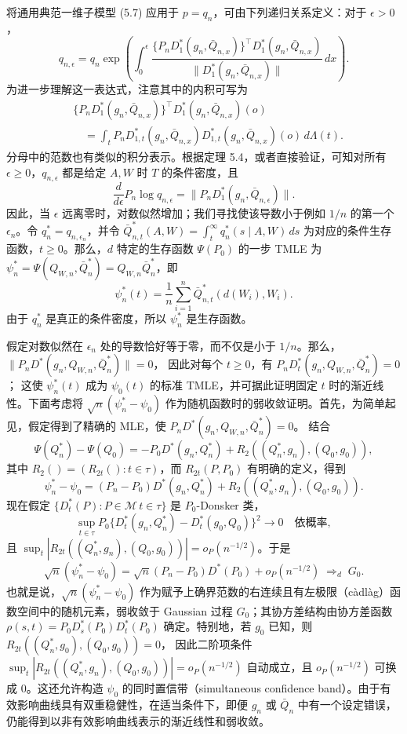 将通用典范一维子模型 (5.7) 应用于 $p=q_n$，可由下列递归关系定义：对于 $\epsilon>0$，
\[
 q_{n,\epsilon}=q_n\exp\left(\int_0^\epsilon
 \frac{\{P_nD_1^*(g_n,\bar Q_{n,x})\}^{\top}
 D_1^*(g_n,\bar Q_{n,x})}
 {\|D_1^*(g_n,\bar Q_{n,x})\|}\,dx\right).
\]
为进一步理解这一表达式，注意其中的内积可写为
\begin{equation}
 \begin{aligned}
 &\{P_nD_1^*(g_n,\bar Q_{n,x})\}^{\top}
 D_1^*(g_n,\bar Q_{n,x})(o)\\
 &\quad=\int_t P_nD_{1,t}^*(g_n,\bar Q_{n,x})
 D_{1,t}^*(g_n,\bar Q_{n,x})(o)\,d\Lambda(t).
 \end{aligned}
 \tag{5.8}
\end{equation}
分母中的范数也有类似的积分表示。根据定理 5.4，或者直接验证，可知对所有 $\epsilon\geq0$，$q_{n,\epsilon}$ 都是给定 $A,W$ 时 $T$ 的条件密度，且
\[
 \frac{d}{d\epsilon}P_n\log q_{n,\epsilon}
 =\|P_nD_1^*(g_n,\bar Q_{n,\epsilon})\|.
\]
因此，当 $\epsilon$ 远离零时，对数似然增加；我们寻找使该导数小于例如 $1/n$ 的第一个 $\epsilon_n$。令 $q_n^*=q_{n,\epsilon_n}$，并令
$\bar Q_{n,t}^*(A,W)=\int_t^\infty q_n^*(s\mid A,W)\,ds$
为对应的条件生存函数，$t\geq0$。那么，$d$ 特定的生存函数 $\Psi(P_0)$ 的一步 TMLE 为
$\psi_n^*=\Psi(Q_{W,n},\bar Q_n^*)=Q_{W,n}\bar Q_n^*$，即
\[
 \psi_n^*(t)=\frac1n\sum_{i=1}^n\bar Q_{n,t}^*(d(W_i),W_i).
\]
由于 $q_n^*$ 是真正的条件密度，所以 $\psi_n^*$ 是生存函数。

假定对数似然在 $\epsilon_n$ 处的导数恰好等于零，而不仅是小于 $1/n$。那么，
$\|P_nD^*(g_n,Q_{W,n},\bar Q_n^*)\|=0$，
因此对每个 $t\geq0$，有
$P_nD_t^*(g_n,Q_{W,n},\bar Q_n^*)=0$；
这使 $\psi_n^*(t)$ 成为 $\psi_0(t)$ 的标准 TMLE，并可据此证明固定 $t$ 时的渐近线性。下面考虑将 $\sqrt n(\psi_n^*-\psi_0)$ 作为随机函数时的弱收敛证明。首先，为简单起见，假定得到了精确的 MLE，使
$P_nD^*(g_n,Q_{W,n},\bar Q_n^*)=0$。
结合
\[
 \Psi(Q_n^*)-\Psi(Q_0)
 =-P_0D^*(g_n,Q_n^*)+R_2((Q_n^*,g_n),(Q_0,g_0)),
\]
其中 $R_2()=(R_{2t}():t\in\tau)$，而 $R_{2t}(P,P_0)$ 有明确的定义，得到
\[
 \psi_n^*-\psi_0
 =(P_n-P_0)D^*(g_n,Q_n^*)+R_2((Q_n^*,g_n),(Q_0,g_0)).
\]
现在假定 $\{D_t^*(P):P\in\mathcal M\,t\in\tau\}$ 是 $P_0$-Donsker 类，
\[
 \sup_{t\in\tau}P_0\{D_t^*(g_n,Q_n^*)-D_t^*(g_0,Q_0)\}^2
 \longrightarrow0
 \quad\text{依概率},
\]
且 $\sup_t|R_{2t}((Q_n^*,g_n),(Q_0,g_0))|=o_P(n^{-1/2})$。于是
\[
 \sqrt n(\psi_n^*-\psi_0)
 =\sqrt n(P_n-P_0)D^*(P_0)+o_P(n^{-1/2})
 \;\Rightarrow_d\;G_0.
\]
也就是说，$\sqrt n(\psi_n^*-\psi_0)$ 作为赋予上确界范数的右连续且有左极限（càdlàg）函数空间中的随机元素，弱收敛于 Gaussian 过程 $G_0$；其协方差结构由协方差函数
$\rho(s,t)=P_0D_s^*(P_0)D_t^*(P_0)$
确定。特别地，若 $g_0$ 已知，则
$R_{2t}((Q_n^*,g_0),(Q_0,g_0))=0$，
因此二阶项条件
$\sup_t|R_{2t}((Q_n^*,g_n),(Q_0,g_0))|=o_P(n^{-1/2})$
自动成立，且 $o_P(n^{-1/2})$ 可换成 0。这还允许构造 $\psi_0$ 的同时置信带（simultaneous confidence band）。由于有效影响曲线具有双重稳健性，在适当条件下，即便 $g_n$ 或 $\bar Q_n$ 中有一个设定错误，仍能得到以非有效影响曲线表示的渐近线性和弱收敛。

